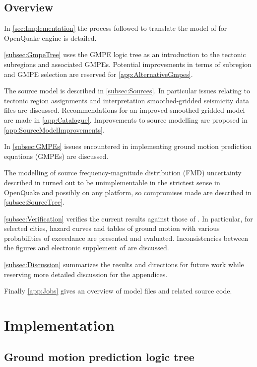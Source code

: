 \documentclass{article}
\begin{document}
\subsection{Overview}
\label{subsec:Overview}

In \autoref{sec:Implementation} the process followed to translate the model of \cite{nath2012probabilistic} for OpenQuake-engine is detailed.

\autoref{subsec:GmpeTree} uses the GMPE logic tree as an introduction to the tectonic subregions and associated GMPEs. Potential improvements in terms of subregion and GMPE selection are reserved for \autoref{app:AlternativeGmpes}.

The source model is described in \autoref{subsec:Sources}.
In particular issues relating to tectonic region assignments and interpretation smoothed-gridded seismicity data files are discussed. 
Recommendations for an improved smoothed-gridded model are made in \autoref{app:Catalogue}. 
Improvements to source modelling are proposed in \autoref{app:SourceModelImprovements}.

In \autoref{subsec:GMPEs} issues encountered in implementing ground motion prediction equations (GMPEs) are discussed.

The modelling of source frequency-magnitude distribution (FMD) uncertainty described in \cite{nath2012probabilistic} turned out to be unimplementable in the strictest sense in OpenQuake and possibly on any platform, so compromises made are described in \autoref{subsec:SourceTree}.

\autoref{subsec:Verification} verifies the current results against those of  \cite{nath2012probabilistic}.
In particular, for selected cities, hazard curves and tables of ground motion with various probabilities of exceedance are presented and evaluated.
Inconsistencies between the figures and electronic supplement of \cite{nath2012probabilistic} are discussed.

\autoref{subsec:Discussion} summarizes the results and directions for future work while reserving more detailed discussion for the appendices.

Finally \autoref{app:Jobs} gives an overview of model files and related source code.

\section{Implementation}
\label{sec:Implementation}

\subsection{Ground motion prediction logic tree}
\label{subsec:GmpeTree}
\end{document}
